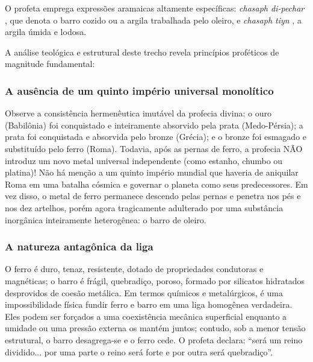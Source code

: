 O profeta emprega expressões aramaicas altamente específicas: \textit{chasaph di-pechar} , que denota o barro cozido ou a argila trabalhada pelo oleiro, e \textit{chasaph tiyn} , a argila úmida e lodosa.

A análise teológica e estrutural deste trecho revela princípios proféticos de magnitude fundamental:


\subsubsection*{A ausência de um quinto império universal monolítico}
Observe a consistência hermenêutica imutável da profecia divina: o ouro (Babilônia) foi conquistado e inteiramente absorvido pela prata (Medo-Pérsia); a prata foi conquistada e absorvida pelo bronze (Grécia); e o bronze foi esmagado e substituído pelo ferro (Roma). Todavia, após as pernas de ferro, a profecia NÃO introduz um novo metal universal independente (como estanho, chumbo ou platina)! Não há menção a um quinto império mundial que haveria de aniquilar Roma em uma batalha cósmica e governar o planeta como seus predecessores. Em vez disso, o metal de ferro permanece descendo pelas pernas e penetra nos pés e nos dez artelhos, porém agora tragicamente adulterado por uma substância inorgânica inteiramente heterogênea: o barro de oleiro.


\subsubsection*{A natureza antagônica da liga}
O ferro é duro, tenaz, resistente, dotado de propriedades condutoras e magnéticas; o barro é frágil, quebradiço, poroso, formado por silicatos hidratados desprovidos de coesão metálica. Em termos químicos e metalúrgicos, é uma impossibilidade física fundir ferro e barro em uma liga homogênea verdadeira. Eles podem ser forçados a uma coexistência mecânica superficial enquanto a umidade ou uma pressão externa os mantém juntos; contudo, sob a menor tensão estrutural, o barro desagrega-se e o ferro cede. O profeta declara: ``será um reino dividido... por uma parte o reino será forte e por outra será quebradiço''.


